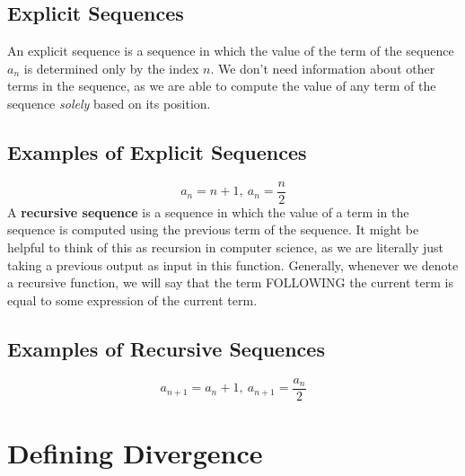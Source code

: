 \documentclass{report}
\newtheorem{definition}{Definition}
\begin{document}
\begin{sloppypar}
\subsection{Explicit Sequences}
An explicit sequence is a sequence in which the value of the term of the sequence $ a_{n}$ is determined only by the
index $ n $. We don't need information about other terms in the sequence, as we are able to compute the value of any
term of the sequence \textit{solely} based on its position.
\subsection{Examples of Explicit Sequences}
\[ a_{n} = n + 1, ~ a_{n} = \frac{n}{2} \]
A \textbf{recursive sequence} is a sequence in which the value of a term in the sequence is computed using the previous
term of the sequence. It might be helpful to think of this as recursion in computer science, as we are literally just taking
a previous output as input in this function. Generally, whenever we denote a recursive function, we will say that the
term FOLLOWING the current term is equal to some expression of the current term.
\subsection{Examples of Recursive Sequences}
\[ a_{n+1} = a_{n} + 1, ~ a_{n+1} = \frac{a_{n}}{2}\]



\section{Defining Divergence}
\begin{center}
\end{center}
\begin{center}
\end{center}


\end{sloppypar}
\end{document}
